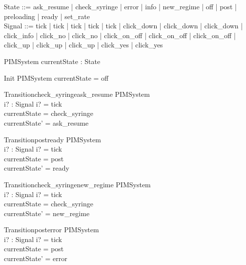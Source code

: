 
\begin{zed}
  State ::= ask_resume | check_syringe | error | info | new_regime | off | post | preloading | ready | set_rate \\
  Signal ::= tick | tick | tick | tick | tick | click\_down | click\_down | click\_down | click\_info | click\_no | click\_no | click\_on\_off | click\_on\_off | click\_on\_off | click\_up | click\_up | click\_up | click\_yes | click\_yes 
\end{zed}

\begin{schema}{PIMSystem}
  currentState : State
\end{schema}

\begin{schema}{Init}
  PIMSystem
\where
  currentState = off
\end{schema}

\begin{schema}{Transitioncheck\_syringeask\_resume}
  \Delta PIMSystem\\
  i? : Signal
\where
  i? = tick \\
  currentState = check\_syringe \\
  currentState' = ask\_resume
\end{schema}

\begin{schema}{Transitionpostready}
  \Delta PIMSystem\\
  i? : Signal
\where
  i? = tick \\
  currentState = post \\
  currentState' = ready
\end{schema}

\begin{schema}{Transitioncheck\_syringenew\_regime}
  \Delta PIMSystem\\
  i? : Signal
\where
  i? = tick \\
  currentState = check\_syringe \\
  currentState' = new\_regime
\end{schema}

\begin{schema}{Transitionposterror}
  \Delta PIMSystem\\
  i? : Signal
\where
  i? = tick \\
  currentState = post \\
  currentState' = error
\end{schema}

